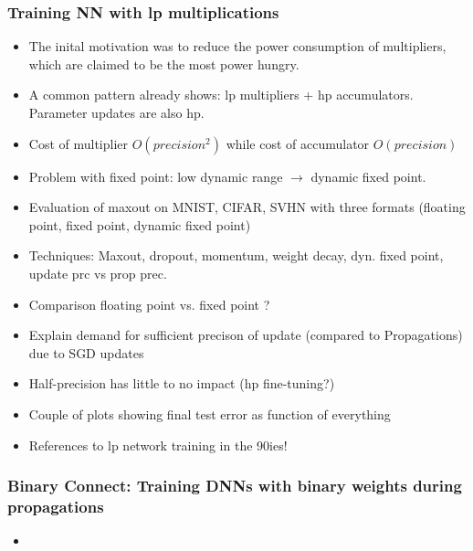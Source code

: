 \documentclass{article}
\begin{document}
\subsubsection*{Training NN with lp multiplications}
    \begin{itemize}
    \item The inital motivation was to reduce the power consumption of multipliers, which are claimed to be the most power hungry.
    \item A common pattern already shows: lp multipliers + hp accumulators. Parameter updates are also hp.
    \item Cost of multiplier $O(precision^2)$ while cost of accumulator $O(precision)$
    \item Problem with fixed point: low dynamic range $\rightarrow$ dynamic fixed point.
    \item Evaluation of maxout on MNIST, CIFAR, SVHN with three formats (floating
    point, fixed point, dynamic fixed point)
    \item Techniques: Maxout, dropout, momentum, weight decay, dyn. fixed point, update prc vs prop prec.
    \item Comparison floating point vs. fixed point ?
    \item Explain demand for sufficient precison of update (compared to Propagations) due to SGD updates
    \item Half-precision has little to no impact (hp fine-tuning?)
    \item Couple of plots showing final test error as function of everything
    \item References to lp network training in the 90ies!
    \end{itemize}

\subsubsection*{Binary Connect: Training DNNs with binary weights during propagations}
\begin{itemize}
\item 
\end{itemize}
\end{document}
